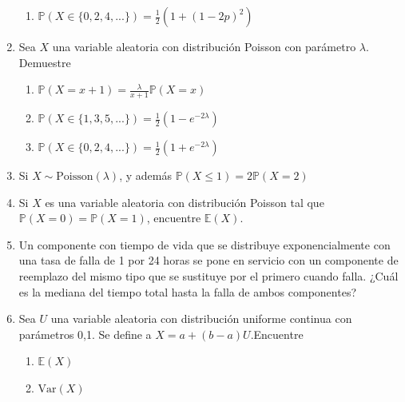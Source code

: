 \documentclass[11pt,a4paper]{report}
\begin{document}
\begin{enumerate}
{\begin{enumerate}
				\item {
					$\mathbb{P}(X \in \{ 0,2,4,...\}) = \frac{1}{2}
					 (1 + (1 - 2p)^2)$
				}
			\end{enumerate}
		}

		\item{
		Sea $X$ una variable aleatoria con distribución Poisson con parámetro
		$\lambda$. Demuestre
			\begin{enumerate}
				\item {
					$\mathbb{P}(X = x + 1) = \frac{\lambda}{x + 1}
					 \mathbb{P}(X = x)$
				}

				\item {
					$\mathbb{P}(X \in \{ 1,3,5,...\}) = \frac{1}{2}
					 (1 - e^{-2\lambda})$
				}

				\item {
					$\mathbb{P}(X \in \{ 0,2,4,...\}) = \frac{1}{2}
					 (1 + e^{-2\lambda})$
				}
			\end{enumerate}
		}

		\item{
			Si $X \sim \text{Poisson}(\lambda)$, y además $\mathbb{P}(X \leq 1)
			= 2\mathbb{P}(X = 2)$
		}

		\item{
			Si $X$ es una variable aleatoria con distribución Poisson tal que
			$\mathbb{P}(X = 0) = \mathbb{P}(X = 1)$, encuentre $\mathbb{E}(X)$.
		}

		\item{
			Un componente con tiempo de vida que se distribuye exponencialmente
			con una tasa de falla de 1 por 24 horas se pone en servicio con un
			componente de reemplazo del mismo tipo que se sustituye por el
			primero cuando falla. ¿Cuál es la mediana del tiempo total hasta la
			falla de ambos componentes?
		}

		\item{
			Sea $U$ una variable aleatoria con distribución uniforme continua
			con parámetros 0,1. Se define a $X = a+(b - a)U$.Encuentre
			\begin{enumerate}
				\item {
					$\mathbb{E}(X)$
				}

				\item {
					$\text{Var}(X)$
				}
			\end{enumerate}

		}

	\end{enumerate}
\end{document}
